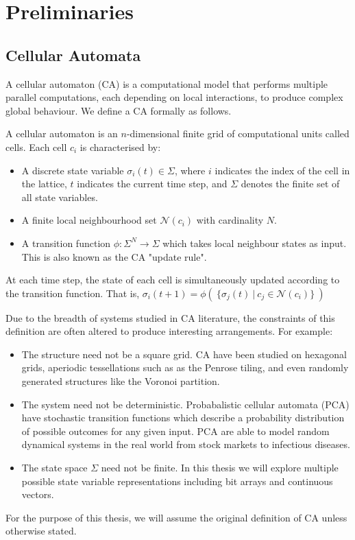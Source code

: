 \chapter{Preliminaries}

\section{Cellular Automata}

A cellular automaton (CA) is a computational model that performs multiple parallel computations, each depending on local interactions, to produce complex global behaviour. We define a CA formally as follows.

\begin{definition}
A cellular automaton is an $n$-dimensional finite grid of computational units called cells. Each cell $c_i$ is characterised by:
\begin{itemize}
  \item A discrete state variable $\sigma_i(t) \in \Sigma$, where $i$ indicates the index of the cell in the lattice, $t$ indicates the current time step, and $\Sigma$ denotes the finite set of all state variables.
  \item A finite local neighbourhood set $\mathcal{N}(c_i)$ with cardinality $N$.
  \item A transition function $\phi:\Sigma^N \to \Sigma$ which takes local neighbour states as input. This is also known as the CA "update rule".
\end{itemize}

At each time step, the state of each cell is simultaneously updated according to the transition function. That is, $\sigma_i(t+1) = \phi( \:\{ \sigma_j(t) \: | \: c_j \in \mathcal{N}(c_i) \} \:)$
\end{definition}

Due to the breadth of systems studied in CA literature, the constraints of this definition are often altered to produce interesting arrangements. For example:
\begin{itemize}
  \item The structure need not be a square grid. CA have been studied on hexagonal grids\cite{encinas2007modelling}, aperiodic tessellations such as as the Penrose tiling\cite{goucher2012gliders}, and even randomly generated structures like the Voronoi partition\cite{shi2000development}.
  \item The system need not be deterministic. Probabalistic cellular automata (PCA) have stochastic transition functions which describe a probability distribution of possible outcomes for any given input. PCA are able to model random dynamical systems in the real world from stock markets\cite{bartolozzi2004stochastic} to infectious diseases\cite{mikler2005modeling}.
  \item The state space $\Sigma$ need not be finite. In this thesis we will explore multiple possible state variable representations including bit arrays and continuous vectors.
\end{itemize}
For the purpose of this thesis, we will assume the original definition of CA unless otherwise stated. 

